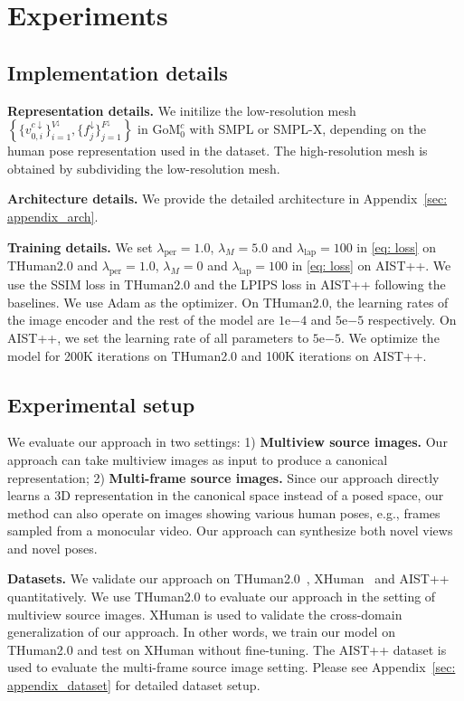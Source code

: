 \section{Experiments}
\label{sec:exp}

\subsection{Implementation details}
\textbf{Representation details.} We initilize the low-resolution mesh $\left\{\{v_{0, i}^{c\downarrow}\}_{i=1}^{V^\downarrow}, \{f_{j}^\downarrow\}_{j=1}^{F^\downarrow}\right\}$ in $\text{GoM}_0^c$ with SMPL or SMPL-X, %
depending on the human pose representation used in the dataset. The high-resolution mesh is obtained by subdividing the low-resolution mesh. %

\textbf{Architecture details.} We provide the detailed architecture in Appendix~\ref{sec: appendix_arch}. %

\textbf{Training details.} We set $\lambda_\text{per}=1.0$, $\lambda_M=5.0$ and $\lambda_\text{lap}=100$ in \cref{eq: loss} on THuman2.0 and $\lambda_\text{per}=1.0$, $\lambda_M=0$ and $\lambda_\text{lap}=100$ in \cref{eq: loss} on AIST++. We use the SSIM loss in THuman2.0 and the LPIPS loss in AIST++ following the baselines. We use Adam as the optimizer. On THuman2.0, the learning rates of the image encoder and the rest of the model are $1\mathrm{e}{-4}$ and $5\mathrm{e}{-5}$ respectively. On AIST++, we set the learning rate of all parameters to $5\mathrm{e}{-5}$. We optimize the model for 200K iterations on THuman2.0 and 100K iterations on AIST++.

\subsection{Experimental setup}
We evaluate our approach in two settings: 1) \textbf{Multiview source images.} Our approach can take multiview images as input to produce a canonical representation;  2) \textbf{Multi-frame source images.} Since our approach directly learns a 3D representation in the canonical space instead of a posed space, our method can also operate on images showing various human poses, e.g., frames sampled from a monocular video. 
Our approach can synthesize both novel views and novel poses.

\textbf{Datasets.} We validate our approach on THuman2.0~\citep{tao2021function4d}, XHuman~\citep{shen2023xavatar} and AIST++~\citep{li2021learn} quantitatively. We use THuman2.0 to evaluate our approach in the setting of multiview source images.  XHuman  is used to validate the cross-domain generalization of our approach. In other words, we train our model on THuman2.0 and test on XHuman without fine-tuning. The AIST++ dataset is used to evaluate the  multi-frame source image setting. Please see Appendix~\ref{sec: appendix_dataset} for detailed dataset setup.



